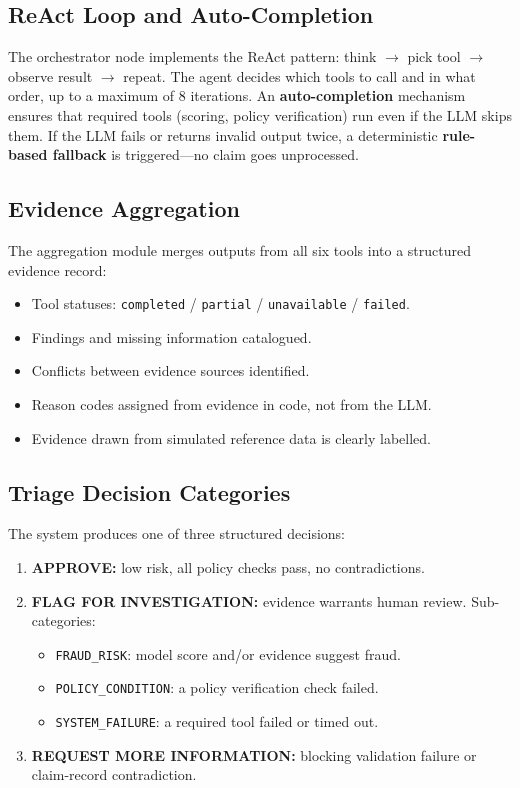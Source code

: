 \documentclass[12pt,a4paper]{article}
\begin{document}
\subsection{ReAct Loop and Auto-Completion}

The orchestrator node implements the ReAct pattern: think $\rightarrow$ pick tool $\rightarrow$ observe result $\rightarrow$ repeat.  The agent decides which tools to call and in what order, up to a maximum of 8 iterations.  An \textbf{auto-completion} mechanism ensures that required tools (scoring, policy verification) run even if the LLM skips them.  If the LLM fails or returns invalid output twice, a deterministic \textbf{rule-based fallback} is triggered---no claim goes unprocessed.

\subsection{Evidence Aggregation}

The aggregation module merges outputs from all six tools into a structured evidence record:
\begin{itemize}
    \item Tool statuses: \texttt{completed} / \texttt{partial} / \texttt{unavailable} / \texttt{failed}.
    \item Findings and missing information catalogued.
    \item Conflicts between evidence sources identified.
    \item Reason codes assigned from evidence in code, not from the LLM.
    \item Evidence drawn from simulated reference data is clearly labelled.
\end{itemize}

\subsection{Triage Decision Categories}

The system produces one of three structured decisions:

\begin{enumerate}
    \item \textbf{APPROVE:} low risk, all policy checks pass, no contradictions.
    \item \textbf{FLAG FOR INVESTIGATION:} evidence warrants human review.  Sub-categories:
    \begin{itemize}
        \item \texttt{FRAUD\_RISK}: model score and/or evidence suggest fraud.
        \item \texttt{POLICY\_CONDITION}: a policy verification check failed.
        \item \texttt{SYSTEM\_FAILURE}: a required tool failed or timed out.
    \end{itemize}
    \item \textbf{REQUEST MORE INFORMATION:} blocking validation failure or claim-record contradiction.
\end{enumerate}
\end{document}
